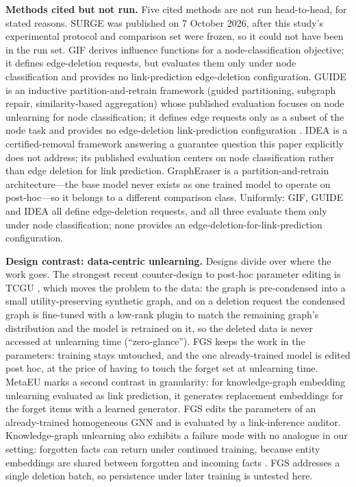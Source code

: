 \documentclass[pdflatex,sn-basic,Numbered]{sn-jnl}
\begin{document}
\textbf{Methods cited but not run.} Five cited methods are not run head-to-head, for stated reasons. SURGE \cite{surge2026} was published on 7 October 2026, after this study's experimental protocol and comparison set were frozen, so it could not have been in the run set. GIF \cite{gif2023} derives influence functions for a node-classification objective; it defines edge-deletion requests, but evaluates them only under node classification and provides no link-prediction edge-deletion configuration. GUIDE is an inductive partition-and-retrain framework (guided partitioning, subgraph repair, similarity-based aggregation) whose published evaluation focuses on node unlearning for node classification; it defines edge requests only as a subset of the node task and provides no edge-deletion link-prediction configuration \cite{guide2023}. IDEA \cite{idea2024} is a certified-removal framework answering a guarantee question this paper explicitly does not address; its published evaluation centers on node classification rather than edge deletion for link prediction. GraphEraser \cite{grapheraser2022} is a partition-and-retrain architecture---the base model never exists as one trained model to operate on post-hoc---so it belongs to a different comparison class. Uniformly: GIF, GUIDE and IDEA all define edge-deletion requests, and all three evaluate them only under node classification; none provides an edge-deletion-for-link-prediction configuration.

\textbf{Design contrast: data-centric unlearning.} Designs divide over where the work goes. The strongest recent counter-design to post-hoc parameter editing is TCGU \cite{tcgu2026}, which moves the problem to the data: the graph is pre-condensed into a small utility-preserving synthetic graph, and on a deletion request the condensed graph is fine-tuned with a low-rank plugin to match the remaining graph's distribution and the model is retrained on it, so the deleted data is never accessed at unlearning time (``zero-glance''). FGS keeps the work in the parameters: training stays untouched, and the one already-trained model is edited post hoc, at the price of having to touch the forget set at unlearning time. MetaEU \cite{metaeu2025} marks a second contrast in granularity: for knowledge-graph embedding unlearning evaluated as link prediction, it generates replacement embeddings for the forget items with a learned generator. FGS edits the parameters of an already-trained homogeneous GNN and is evaluated by a link-inference auditor. Knowledge-graph unlearning also exhibits a failure mode with no analogue in our setting: forgotten facts can return under continued training, because entity embeddings are shared between forgotten and incoming facts \cite{forgottenfacts2026}. FGS addresses a single deletion batch, so persistence under later training is untested here.
\end{document}
